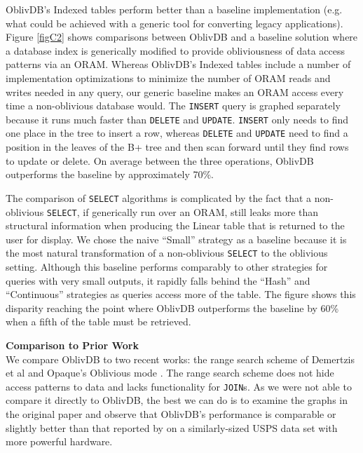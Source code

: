 \documentclass[USenglish,oneside,twocolumn]{article}
\def\name/{OblivDB}
\begin{document}
\name/'s Indexed tables perform better than a baseline implementation (e.g. what could be achieved with a generic tool for converting legacy applications). Figure \ref{figC2} shows comparisons between \name/ and a baseline solution where a database index is generically modified to provide obliviousness of data access patterns via an ORAM. Whereas \name/'s Indexed tables include a number of implementation optimizations to minimize the number of ORAM reads and writes needed in any query, our generic baseline makes an ORAM access every time a non-oblivious database would. The \texttt{INSERT} query is graphed separately because it runs much faster than \texttt{DELETE} and \texttt{UPDATE}. \texttt{INSERT} only needs to find one place in the tree to insert a row, whereas \texttt{DELETE} and \texttt{UPDATE} need to find a position in the leaves of the B+ tree and then scan forward until they find rows to update or delete. On average between the three operations, \name/ outperforms the baseline by approximately 70\%. 

The comparison of \texttt{SELECT} algorithms is complicated by the fact that a non-oblivious \texttt{SELECT}, if generically run over an ORAM, still leaks more than structural information when producing the Linear table that is returned to the user for display. We chose the naive ``Small'' strategy as a baseline because it is the most natural transformation of a non-oblivious \texttt{SELECT} to the oblivious setting. Although this baseline performs comparably to other strategies for queries with very small outputs, it rapidly falls behind the ``Hash'' and ``Continuous'' strategies as queries access more of the table. The figure shows this disparity reaching the point where \name/ outperforms the baseline by 60\% when a fifth of the table must be retrieved. 

\medskip \noindent \textbf{Comparison to Prior Work}\\

We compare \name/ to two recent works: the range search scheme of Demertzis et al \cite{DPP+16} and Opaque's Oblivious mode \cite{ZDB+17}. The range search scheme does not hide access patterns to data and lacks functionality for \texttt{JOIN}s. As we were not able to compare it directly to \name/, the best we can do is to examine the graphs in the original paper and observe that \name/'s performance is comparable or slightly better than that reported by \cite{DPP+16} on a similarly-sized USPS data set with more powerful hardware. 
\end{document}
